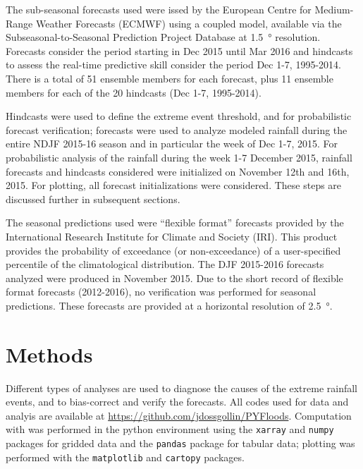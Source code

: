 \documentclass[twocol]{ametsoc}
\begin{document}
The sub-seasonal forecasts used were issed by the European Centre for Medium-Range Weather Forecasts (ECMWF) using a coupled model, available via the Subseasonal-to-Seasonal Prediction Project Database \citep{Vitart2016} at \SI{1.5}{\degree} resolution.
Forecasts consider the period starting in Dec 2015 until Mar 2016 and hindcasts to assess the real-time predictive skill consider the period Dec 1-7, 1995-2014.
There is a total of 51 ensemble members for each forecast, plus 11 ensemble members for each of the 20 hindcasts (Dec 1-7, 1995-2014).

Hindcasts were used to define the extreme event threshold, and for probabilistic forecast verification; forecasts were used to analyze modeled rainfall during the entire NDJF 2015-16 season and in particular the week of Dec 1-7, 2015.
For probabilistic analysis of the rainfall during the week 1-7 December 2015, rainfall forecasts and hindcasts considered were initialized on November 12th and 16th, 2015.
For plotting, all forecast initializations were considered.
These steps are discussed further in subsequent sections.

The seasonal predictions used were ``flexible format'' forecasts provided by the International Research Institute for Climate and Society (IRI).
This product provides the probability of exceedance (or non-exceedance) of a user-specified percentile of the climatological distribution.
The DJF 2015-2016 forecasts analyzed were produced in November 2015.
Due to the short record of flexible format forecasts (2012-2016), no verification was performed for seasonal predictions.
These forecasts are provided at a horizontal resolution of \SI{2.5}{\degree}.


\section{Methods} \label{sec:methods}

Different types of analyses are used to diagnose the causes of the extreme rainfall events, and to bias-correct and verify the forecasts.
All codes used for data and analyis are available at \url{https://github.com/jdossgollin/PYFloods}.
Computation with was performed in the python environment using the \texttt{xarray} \citep{hoyer2017xarray} and \texttt{numpy} \citep{vanderWalt:2011dp} packages for gridded data and the \texttt{pandas} \citep{McKinney:2010un} package for tabular data; plotting was performed with the \texttt{matplotlib} \citep{Hunter:2007ux} and \texttt{cartopy} \citep{Cartopy} packages.
\end{document}
